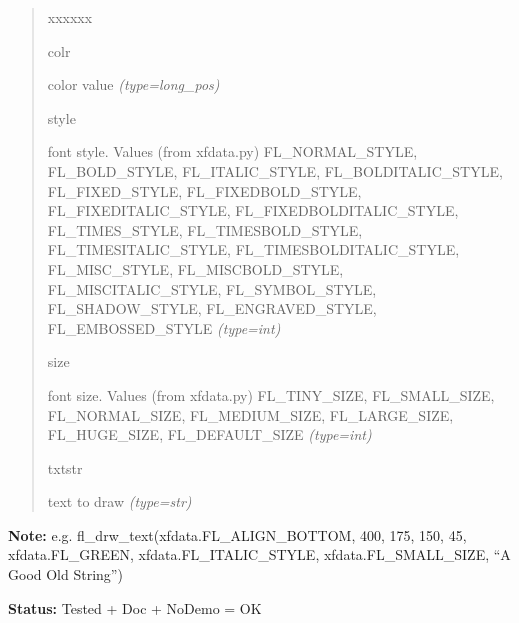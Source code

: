 \begin{boxedminipage}{\funcwidth}
\begin{quote}
\begin{Ventry}{xxxxxx}
          \item[colr]


color value
            {\it (type=long\_pos)}

          \item[style]


font style. Values (from xfdata.py) FL\_NORMAL\_STYLE, FL\_BOLD\_STYLE,
FL\_ITALIC\_STYLE, FL\_BOLDITALIC\_STYLE, FL\_FIXED\_STYLE,
FL\_FIXEDBOLD\_STYLE, FL\_FIXEDITALIC\_STYLE, FL\_FIXEDBOLDITALIC\_STYLE,
FL\_TIMES\_STYLE, FL\_TIMESBOLD\_STYLE, FL\_TIMESITALIC\_STYLE,
FL\_TIMESBOLDITALIC\_STYLE, FL\_MISC\_STYLE, FL\_MISCBOLD\_STYLE,
FL\_MISCITALIC\_STYLE, FL\_SYMBOL\_STYLE, FL\_SHADOW\_STYLE,
FL\_ENGRAVED\_STYLE, FL\_EMBOSSED\_STYLE
            {\it (type=int)}

          \item[size]


font size. Values (from xfdata.py) FL\_TINY\_SIZE, FL\_SMALL\_SIZE,
FL\_NORMAL\_SIZE, FL\_MEDIUM\_SIZE, FL\_LARGE\_SIZE, FL\_HUGE\_SIZE,
FL\_DEFAULT\_SIZE
            {\it (type=int)}

          \item[txtstr]


text to draw
            {\it (type=str)}

        \end{Ventry}

      \end{quote}

\textbf{Note:} 
e.g. fl\_drw\_text(xfdata.FL\_ALIGN\_BOTTOM, 400, 175, 150, 45,
xfdata.FL\_GREEN, xfdata.FL\_ITALIC\_STYLE, xfdata.FL\_SMALL\_SIZE,
``A Good Old String'')


\textbf{Status:} 
Tested + Doc + NoDemo = OK


    \end{boxedminipage}

    \label{xformslib:flbasic:fl_drw_text_beside}

    \vspace{0.5ex}

